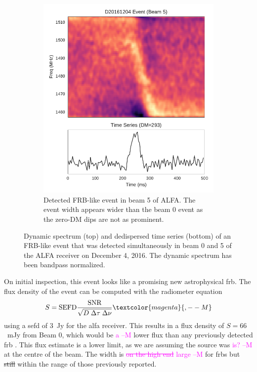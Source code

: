 \documentclass[a4paper,fleqn,usenatbib]{mnras}
\newcommand{\cM}[1]{\textcolor{magenta}{ #1 --M}}
\begin{document}
\begin{figure}
\begin{subfigure}[t]{0.45\textwidth}
        \includegraphics[width=1.0\textwidth]{figures/D20161204_buf4_Beam5.pdf}
        \caption{Detected FRB-like event in beam 5 of ALFA. The event width
        appears wider than the beam 0 event as the zero-DM dips are not as
        prominent.
        }
        \label{fig:beam5_dynamic_spec}
    \end{subfigure}
    \caption{
    Dynamic spectrum (top) and dedispersed time series (bottom) of an FRB-like
    event that was detected simultaneously in beam 0 and 5 of the ALFA receiver
    on December 4, 2016. The dynamic spectrum has been bandpass normalized.
    }
    \label{fig:dynamic_spec}
\end{figure}

On initial inspection, this event looks like a promising new astrophysical
\gls{frb}. The flux density of the event can be computed with the radiometer
equation
%
$$
S = \textrm{SEFD} \frac{\textrm{SNR}}{\sqrt{D \; \Delta \tau \;
\Delta \nu}}\cM{,}
$$
%
using a \gls{sefd} of 3~Jy for the \gls{alfa} receiver. This results in a flux
density of $S = 66$~mJy from Beam 0, which would be \cM{a} lower flux than any
previously detected \gls{frb} \citep{2016PASA...33...45P}. This flux estimate is
a lower limit, as we are assuming the source was\cM{is?} at the centre of the beam. The
width is \cM{\sout{on the high end} large} for \glspl{frb} but \sout{still} within the range of those
previously reported.
\end{document}
